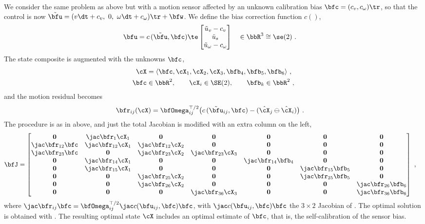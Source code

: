We consider the same problem as above but with a motion sensor affected by an unknown calibration bias $\bfc=(c_v,c_\omega)\tr$,
 so that the control is now $
\tilde\bfu 
=
(v\dt + c_v ,~
0 ,~
\omega \dt + c_\omega)\tr + \bfw
$.
%
We define the bias correction function $c()$,
%
\begin{align}\label{equ:bias}
\bfu &= c\,(\tilde\bfu, \bfc) \te \begin{bmatrix}
\tilde u_v - c_v \\
\tilde u_s \\
\tilde u_\omega - c_\omega
\end{bmatrix} \quad \in \bbR^3\cong\se(2)
~.
\end{align}
%
The state composite is augmented with the unknowns $\bfc$,
%
\begin{align*}
\cX &= \langle
\bfc, \cX_1 , \cX_2 , \cX_3 , \bfb_4 , \bfb_5 , \bfb_6
\rangle
~, 
\\
\bfc&\in\bbR^2,\qquad\cX_i\in\SE(2),\qquad\bfb_k\in\bbR^2
~,
\end{align*}
%
and the motion residual becomes
%
\begin{align*}
\bfr_{ij}(\cX) &= \bfOmega_{ij}^{\top/2}\big(c\,(\tilde\bfu_{ij} , \bfc) - (\hat\cX_j\ominus\hat\cX_i)\big)
~.
\end{align*}
%
The procedure is as in  above, and just the total Jacobian is modified with an extra column on the left,
%
\begin{align*}
\bfJ &= \begin{bmatrix}
\bf0 & \mjac{\bfr_{1}}{\cX_1} & \bf0 & \bf0 & \bf0 & \bf0 & \bf0 \\ 
\mjac{\bfr_{12}}{\bfc} & \mjac{\bfr_{12}}{\cX_1} & \mjac{\bfr_{12}}{\cX_2} & \bf0 & \bf0 & \bf0 & \bf0 \\ 
\mjac{\bfr_{23}}{\bfc} & \bf0 & \mjac{\bfr_{23}}{\cX_2} & \mjac{\bfr_{23}}{\cX_3} & \bf0 & \bf0 & \bf0 \\ 
\bf0 & \mjac{\bfr_{14}}{\cX_1} & \bf0 & \bf0 & \mjac{\bfr_{14}}{\bfb_4} & \bf0 & \bf0 \\ 
\bf0 & \mjac{\bfr_{15}}{\cX_1} & \bf0 & \bf0 & \bf0 & \mjac{\bfr_{15}}{\bfb_5} & \bf0 \\ 
\bf0 & \bf0 & \mjac{\bfr_{25}}{\cX_2} & \bf0 & \bf0 & \mjac{\bfr_{25}}{\bfb_5} & \bf0 \\ 
\bf0 & \bf0 & \mjac{\bfr_{26}}{\cX_2} & \bf0 & \bf0 & \bf0 & \mjac{\bfr_{26}}{\bfb_6} \\ 
\bf0 & \bf0 & \bf0 & \mjac{\bfr_{36}}{\cX_3} & \bf0 & \bf0 & \mjac{\bfr_{36}}{\bfb_6} 
\end{bmatrix}
~,
\end{align*}
%
where $\mjac{\bfr_{ij}}{\bfc} = \bfOmega_{ij}^{\top/2}\mjac{c(\bfu_{ij} , \bfc)}{\bfc}$, with $\mjac{c(\bfu_{ij} , \bfc)}{\bfc}$ the $3\times 2$ Jacobian of . 
The optimal solution is obtained with .
The resulting optimal state $\cX$ includes an optimal estimate of $\bfc$, that is, the self-calibration of the sensor bias.

